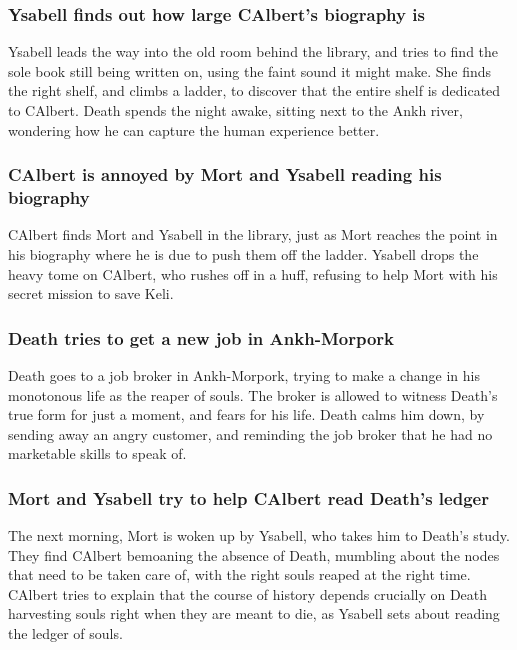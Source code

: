 \subsubsection{\Gls{Ysabell} finds out how large \Gls{CAlbert}'s biography is}
\Gls{Ysabell} leads the way into the old room behind the library, and tries to find the sole book
still being written on, using the faint sound it might make. She finds the right shelf, and climbs
a ladder, to discover that the entire shelf is dedicated to \Gls{CAlbert}. \Gls{Death} spends the
night awake, sitting next to the Ankh river, wondering how he can capture the human experience
better.

\subsubsection{\Gls{CAlbert} is annoyed by \Gls{Mort} and \Gls{Ysabell} reading his biography}
\Gls{CAlbert} finds \Gls{Mort} and \Gls{Ysabell} in the library, just as \Gls{Mort} reaches the
point in his biography where he is due to push them off the ladder. \Gls{Ysabell} drops the heavy
tome on \Gls{CAlbert}, who rushes off in a huff, refusing to help \Gls{Mort} with his secret mission
to save \Gls{Keli}.

\subsubsection{\Gls{Death} tries to get a new job in Ankh-Morpork}
\Gls{Death} goes to a job broker in Ankh-Morpork, trying to make a change in his monotonous life
as the reaper of souls. The broker is allowed to witness \Gls{Death}'s true form for just a moment,
and fears for his life. \Gls{Death} calms him down, by sending away an angry customer, and reminding
the job broker that he had no marketable skills to speak of.

\subsubsection{\Gls{Mort} and \Gls{Ysabell} try to help \Gls{CAlbert} read \Gls{Death}'s ledger}
The next morning, \Gls{Mort} is woken up by \Gls{Ysabell}, who takes him to \Gls{Death}'s study.
They find \Gls{CAlbert} bemoaning the absence of \Gls{Death}, mumbling about the nodes that need to
be taken care of, with the right souls reaped at the right time. \Gls{CAlbert} tries to explain
that the course of history depends crucially on \Gls{Death} harvesting souls right when they are
meant to die, as \Gls{Ysabell} sets about reading the ledger of souls.

